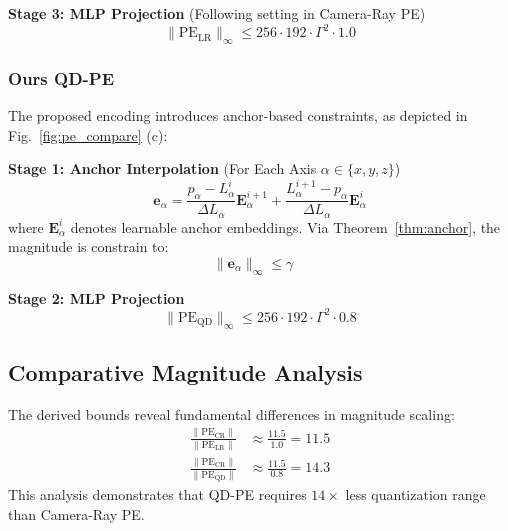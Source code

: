 \textbf{Stage 3: MLP Projection} (Following setting in Camera-Ray PE)
\begin{equation}
    \| \text{PE}_{\text{LR}} \|_\infty \leq 256 \cdot 192 \cdot \Gamma^2 \cdot 1.0
    \label{eq:lr_bound}
\end{equation}

\subsubsection{Ours QD-PE}
\label{subsubsec:qd_pe}
The proposed encoding introduces anchor-based constraints, as depicted in Fig.~\ref{fig:pe_compare} (c):

\textbf{Stage 1: Anchor Interpolation} (For Each Axis $\alpha \in \{x, y, z\}$)
\begin{equation}
    \mathbf{e}_\alpha = \frac{p_\alpha - L_\alpha^i}{\Delta L_\alpha} \mathbf{E}_\alpha^{i+1} + \frac{L_\alpha^{i+1} - p_\alpha}{\Delta L_\alpha} \mathbf{E}_\alpha^i
    \label{eq:anchor_interp}
\end{equation}
where $\mathbf{E}_\alpha^i$ denotes learnable anchor embeddings.
Via Theorem~\ref{thm:anchor}, the magnitude is constrain to:
\begin{equation}
    \| \mathbf{e}_\alpha \|_\infty \leq \gamma \quad 
    \label{eq:anchor_bound}
\end{equation}

\textbf{Stage 2: MLP Projection}
\begin{equation}
    \| \text{PE}_{\text{QD}} \|_\infty \leq 256 \cdot 192 \cdot \Gamma^2 \cdot 0.8
    \label{eq:qd_bound}
\end{equation}

\subsection{Comparative Magnitude Analysis}
\label{subsec:comparative}
The derived bounds reveal fundamental differences in magnitude scaling:
\begin{align}
    \frac{\| \text{PE}_{\text{CR}} \|}{\| \text{PE}_{\text{LR}} \|} &\approx \frac{11.5}{1.0} = 11.5 
    \label{eq:ratio_lidar} \\
    \frac{\| \text{PE}_{\text{CR}} \|}{\| \text{PE}_{\text{QD}} \|} &\approx \frac{11.5}{0.8} = 14.3
    \label{eq:ratio_qd}
\end{align}
This analysis demonstrates that QD-PE requires $14\times$ less quantization range than Camera-Ray PE.


